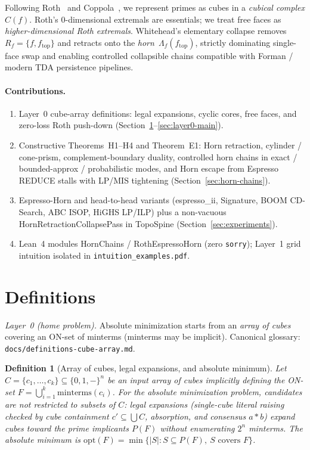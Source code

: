 \documentclass[11pt]{article}
\newtheorem{definition}[theorem]{Definition}
\begin{document}
Following Roth~\cite{roth1957} and Coppola~\cite{coppola1989,coppola2007}, we
represent primes as cubes in a \emph{cubical complex} $C(f)$.  Roth's
$0$-dimensional extremals are essentials; we treat free faces as
\emph{higher-dimensional Roth extremals}.  Whitehead's elementary collapse
removes $R_f=\{f,f_{\mathrm{top}}\}$ and retracts onto the
\emph{horn}~$\Lambda_f(f_{\mathrm{top}})$, strictly dominating single-face swap
and enabling controlled collapsible chains compatible with Forman / modern TDA
persistence pipelines.

\paragraph{Contributions.}
\begin{enumerate}
\item Layer~0 cube-array definitions: legal expansions, cyclic cores, free faces,
and zero-loss Roth push-down (Section~\ref{sec:defs}--\ref{sec:layer0-main}).
\item Constructive Theorems~H1--H4 and Theorem~E1: Horn retraction, cylinder /
cone-prism, complement-boundary duality, controlled horn chains in exact /
bounded-approx / probabilistic modes, and Horn escape from Espresso
\textsf{REDUCE} stalls with LP/MIS tightening (Section~\ref{sec:horn-chains}).
\item \textsf{Espresso-Horn} and head-to-head variants
(\textsf{espresso\_ii}, Signature, BOOM CD-Search, ABC ISOP, HiGHS LP/ILP) plus
a non-vacuous \textsf{HornRetractionCollapsePass} in \textsf{TopoSpine}
(Section~\ref{sec:experiments}).
\item Lean~4 modules \textsf{HornChains} / \textsf{RothEspressoHorn} (zero
\texttt{sorry}); Layer~1 grid intuition isolated in
\texttt{intuition\_examples.pdf}.
\end{enumerate}

\section{Definitions}
\label{sec:defs}

\noindent\textit{Layer~0 (home problem).}  Absolute minimization starts from an
\emph{array of cubes} covering an ON-set of minterms (minterms may be implicit).
Canonical glossary: \texttt{docs/definitions-cube-array.md}.

\begin{definition}[Array of cubes, legal expansions, and absolute minimum]
\label{def:array-cubes}
Let $C=\{c_1,\ldots,c_k\}\subseteq\{0,1,-\}^n$ be an input \emph{array of cubes}
implicitly defining the ON-set $F=\bigcup_{i=1}^k\mathrm{minterms}(c_i)$.  For the
\emph{absolute minimization} problem, candidates are not restricted to subsets of
$C$: \emph{legal expansions} (single-cube literal raising checked by cube
containment $c'\subseteq\bigcup C$, absorption, and consensus $a*b$) expand cubes
toward the prime implicants $P(F)$ without enumerating $2^n$ minterms.  The
\emph{absolute minimum} is
$\mathrm{opt}(F)=\min\{|S|:S\subseteq P(F),\ S\text{ covers }F\}$.
\end{definition}
\end{document}
